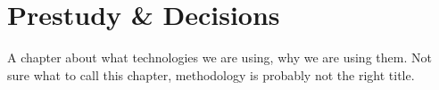 
\chapter{Prestudy \& Decisions}

A chapter about what technologies we are using, why we are using them.
Not sure what to call this chapter, methodology is probably not the right title.

\cleardoublepage